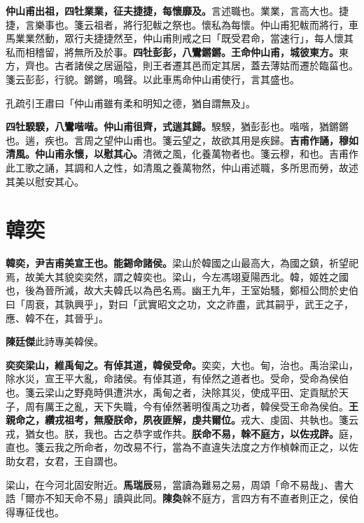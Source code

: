 \textbf{仲山甫出祖，四牡業業，征夫捷捷，每懷靡及。}{\footnotesize 言述職也。業業，言高大也。捷捷，言樂事也。箋云祖者，將行犯軷之祭也。懷私為每懷。仲山甫犯軷而將行，車馬業業然動，眾行夫捷捷然至，仲山甫則戒之曰「既受君命，當速行」，每人懷其私而相稽留，將無所及於事。}\textbf{四牡彭彭，八鸞鏘鏘。王命仲山甫，城彼東方。}{\footnotesize 東方，齊也。古者諸侯之居逼隘，則王者遷其邑而定其居，蓋去薄姑而遷於臨菑也。箋云彭彭，行貌。鏘鏘，鳴聲。以此車馬命仲山甫使行，言其盛也。}

\begin{quoting}孔疏引王肅曰「仲山甫雖有柔和明知之德，猶自謂無及」。\end{quoting}

\textbf{四牡騤騤，八鸞喈喈。仲山甫徂齊，式遄其歸。}{\footnotesize 騤騤，猶彭彭也。喈喈，猶鏘鏘也。遄，疾也。言周之望仲山甫也。箋云望之，故欲其用是疾歸。}\textbf{吉甫作誦，穆如清風。仲山甫永懷，以慰其心。}{\footnotesize 清微之風，化養萬物者也。箋云穆，和也。吉甫作此工歌之誦，其調和人之性，如清風之養萬物然，仲山甫述職，多所思而勞，故述其美以慰安其心。}

\section{韓奕}


\textbf{韓奕，尹吉甫美宣王也。能錫命諸侯。}{\footnotesize 梁山於韓國之山最高大，為國之鎮，祈望祀焉，故美大其貌奕奕然，謂之韓奕也。梁山，今左馮翊夏陽西北。韓，姬姓之國也，後為晉所滅，故大夫韓氏以為邑名焉。幽王九年，王室始騷，鄭桓公問於史伯曰「周衰，其孰興乎」，對曰「武實昭文之功，文之祚盡，武其嗣乎，武王之子，應、韓不在，其晉乎」。}

\begin{quoting}\textbf{陳廷傑}此詩專美韓侯。\end{quoting}

\textbf{奕奕梁山，維禹甸之。有倬其道，韓侯受命。}{\footnotesize 奕奕，大也。甸，治也。禹治梁山，除水災，宣王平大亂，命諸侯。有倬其道，有倬然之道者也。受命，受命為侯伯也。箋云梁山之野堯時俱遭洪水，禹甸之者，決除其災，使成平田、定貢賦於天子，周有厲王之亂，天下失職，今有倬然著明復禹之功者，韓侯受王命為侯伯。}\textbf{王親命之，纘戎祖考，無廢朕命，夙夜匪解，虔共爾位。}{\footnotesize 戎大、虔固、共執也。箋云戎，猶女也。朕，我也。古之恭字或作共。}\textbf{朕命不易，榦不庭方，以佐戎辟。}{\footnotesize 庭，直也。箋云我之所命者，勿改易不行，當為不直違失法度之方作楨榦而正之，以佐助女君，女君，王自謂也。}

\begin{quoting}梁山，在今河北固安附近。\textbf{馬瑞辰}易，當讀為難易之易，周頌「命不易哉」、書大誥「爾亦不知天命不易」讀與此同。\textbf{陳奐}榦不庭方，言四方有不直者則正之，侯伯得專征伐也。\end{quoting}


